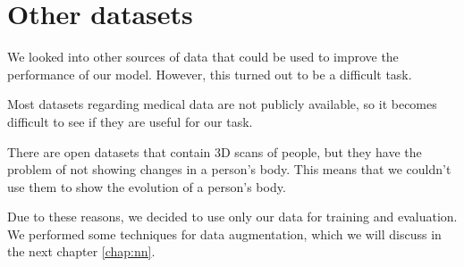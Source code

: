 \section{Other datasets}

We looked into other sources of data that could be used to improve the
performance of our model. However, this turned out to be a difficult task.

Most datasets regarding medical data are not publicly available, so it becomes
difficult to see if they are useful for our task.

There are open datasets that contain 3D scans of people, but they have the
problem of not showing changes in a person's body. This means that we couldn't
use them to show the evolution of a person's body.

Due to these reasons, we decided to use only our data for training and
evaluation. We performed some techniques for data augmentation, which we will
discuss in the next chapter \ref {chap:nn}.